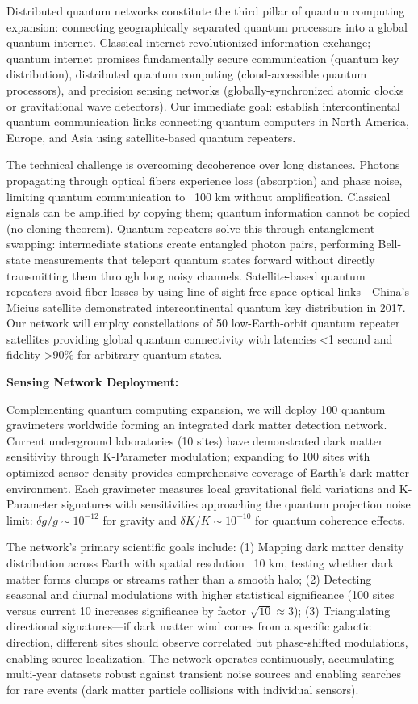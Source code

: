 \documentclass[11pt,a4paper,twoside]{article}
\begin{document}
Distributed quantum networks constitute the third pillar of quantum computing expansion: connecting geographically separated quantum processors into a global quantum internet. Classical internet revolutionized information exchange; quantum internet promises fundamentally secure communication (quantum key distribution), distributed quantum computing (cloud-accessible quantum processors), and precision sensing networks (globally-synchronized atomic clocks or gravitational wave detectors). Our immediate goal: establish intercontinental quantum communication links connecting quantum computers in North America, Europe, and Asia using satellite-based quantum repeaters.

The technical challenge is overcoming decoherence over long distances. Photons propagating through optical fibers experience loss (absorption) and phase noise, limiting quantum communication to ~100 km without amplification. Classical signals can be amplified by copying them; quantum information cannot be copied (no-cloning theorem). Quantum repeaters solve this through entanglement swapping: intermediate stations create entangled photon pairs, performing Bell-state measurements that teleport quantum states forward without directly transmitting them through long noisy channels. Satellite-based quantum repeaters avoid fiber losses by using line-of-sight free-space optical links—China's Micius satellite demonstrated intercontinental quantum key distribution in 2017. Our network will employ constellations of 50 low-Earth-orbit quantum repeater satellites providing global quantum connectivity with latencies <1 second and fidelity >90\% for arbitrary quantum states.

\textbf{Sensing Network Deployment:}

Complementing quantum computing expansion, we will deploy 100 quantum gravimeters worldwide forming an integrated dark matter detection network. Current underground laboratories (10 sites) have demonstrated dark matter sensitivity through K-Parameter modulation; expanding to 100 sites with optimized sensor density provides comprehensive coverage of Earth's dark matter environment. Each gravimeter measures local gravitational field variations and K-Parameter signatures with sensitivities approaching the quantum projection noise limit: $\delta g/g \sim 10^{-12}$ for gravity and $\delta K/K \sim 10^{-10}$ for quantum coherence effects.

The network's primary scientific goals include: (1) Mapping dark matter density distribution across Earth with spatial resolution ~10 km, testing whether dark matter forms clumps or streams rather than a smooth halo; (2) Detecting seasonal and diurnal modulations with higher statistical significance (100 sites versus current 10 increases significance by factor $\sqrt{10} \approx 3$); (3) Triangulating directional signatures—if dark matter wind comes from a specific galactic direction, different sites should observe correlated but phase-shifted modulations, enabling source localization. The network operates continuously, accumulating multi-year datasets robust against transient noise sources and enabling searches for rare events (dark matter particle collisions with individual sensors).
\end{document}
